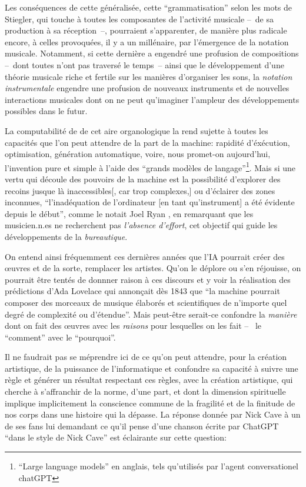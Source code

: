 Les conséquences de cette  généralisée, cette ``grammatisation'' selon les mots de Stiegler, qui touche à toutes les composantes de l'activité musicale --~de sa production à sa réception~--, pourraient s'apparenter, de manière plus radicale encore, à celles provoquées, il y a un millénaire, par l'émergence de la notation musicale. Notamment, si cette dernière a engendré une profusion de compositions --~dont toutes n'ont pas traversé le temps~-- ainsi que le développement d'une théorie musicale riche et fertile sur les manières d'organiser les sons, la \textit{notation instrumentale} engendre une profusion de nouveaux instruments et de nouvelles interactions musicales dont on ne peut qu'imaginer l'ampleur des développements possibles dans le futur.

La computabilité de de cet aire organologique la rend sujette à toutes les capacités que l'on peut attendre de la part de la machine: rapidité d'éxécution, optimisation, génération automatique, voire, nous promet-on aujourd'hui, l'invention pure et simple à l'aide des ``grands modèles de langage''\footnote{``Large language models'' en anglais, tels qu'utilisés par l'agent conversationel chatGPT}. Mais si une vertu qui découle des pouvoirs de la machine est la possibilité d'explorer des recoins jusque là inaccessibles[, car trop complexes,] ou d'éclairer des zones inconnues, ``l'inadéquation de l'ordinateur [en tant qu'instrument] a été évidente depuis le début'', comme le notait Joel Ryan \cite{ryan_remarks_1991}, en remarquant que les musicien.n.es ne recherchent pas \textit{l'absence d'effort}, cet objectif qui guide les développements de la \textit{bureautique}.

On entend ainsi fréquemment ces dernières années que l'IA pourrait créer des œuvres et de la sorte, remplacer les artistes. Qu'on le déplore ou s'en réjouisse, on pourrait être tentés de donnner raison à ces discours et y voir la réalisation des prédictions d'Ada Lovelace qui annonçait dès 1843 que ``la machine pourrait composer des morceaux de musique élaborés et scientifiques de n’importe quel degré de complexité ou d’étendue''\cite{lovelace_translators_1843}. Mais peut-être serait-ce confondre la \textit{manière} dont on fait des œuvres avec les \textit{raisons} pour lesquelles on les fait --~ le ``comment'' avec le ``pourquoi''.

Il ne faudrait pas se méprendre ici de ce qu'on peut attendre, pour la création artistique, de la puissance de l'informatique et confondre sa capacité à suivre une règle et générer un résultat respectant ces règles, avec la création artistique, qui cherche à s'affranchir de la norme, d'une part, et dont la dimension spirituelle implique implicitement la conscience commune de la fragilité et de la finitude de nos corps dans une histoire qui la dépasse. La réponse donnée par Nick Cave à un de ses fans lui demandant ce qu'il pense d'une chanson écrite par ChatGPT ``dans le style de Nick Cave'' est éclairante sur cette question:

